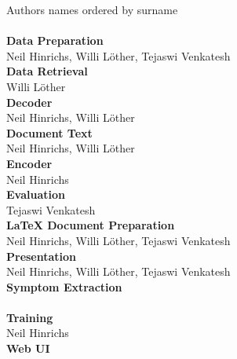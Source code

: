 
Authors names ordered by surname\\
\\
\textbf{Data Preparation}\\
Neil Hinrichs, Willi Löther, Tejaswi Venkatesh
\\
\textbf{Data Retrieval}\\
Willi Löther
\\
\textbf{Decoder}\\
Neil Hinrichs, Willi Löther
\\
\textbf{Document Text}\\
Neil Hinrichs, Willi Löther
\\
\textbf{Encoder}\\
Neil Hinrichs
\\
\textbf{Evaluation}\\
Tejaswi Venkatesh
\\
\textbf{LaTeX Document Preparation}\\
Neil Hinrichs, Willi Löther, Tejaswi Venkatesh
\\
\textbf{Presentation}\\
Neil Hinrichs, Willi Löther, Tejaswi Venkatesh
\\
\textbf{Symptom Extraction}\\
\\
\textbf{Training}\\
Neil Hinrichs
\\
\textbf{Web UI}\\